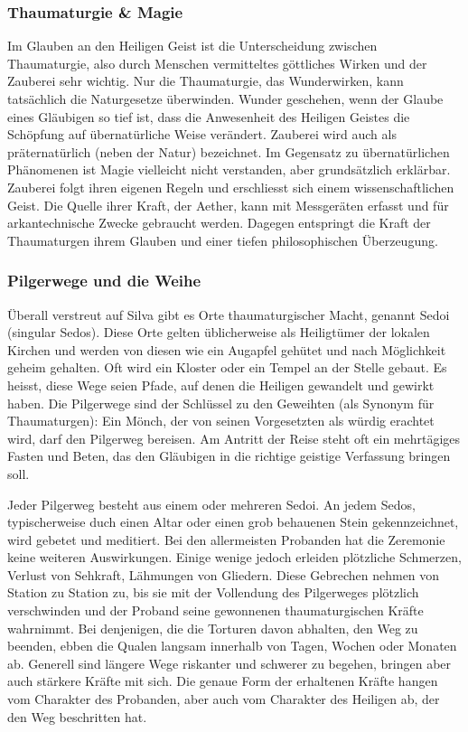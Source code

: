 \documentclass[12pt,twoside,twocolumn,openany]{book}
\begin{document}
	\subsubsection{Thaumaturgie \& Magie}
	Im Glauben an den Heiligen Geist ist die Unterscheidung zwischen Thaumaturgie, also durch Menschen vermitteltes göttliches Wirken und der Zauberei sehr wichtig. Nur die Thaumaturgie, das Wunderwirken, kann tatsächlich die Naturgesetze überwinden. Wunder geschehen, wenn der Glaube eines Gläubigen so tief ist, dass die Anwesenheit des Heiligen Geistes die Schöpfung auf übernatürliche Weise verändert. Zauberei wird auch als präternatürlich (neben der Natur) bezeichnet. Im Gegensatz zu übernatürlichen Phänomenen ist Magie vielleicht nicht verstanden, aber grundsätzlich erklärbar.
	Zauberei folgt ihren eigenen Regeln und erschliesst sich einem wissenschaftlichen Geist. Die Quelle ihrer Kraft, der Aether, kann mit Messgeräten erfasst und für arkantechnische Zwecke gebraucht werden. Dagegen entspringt die Kraft der Thaumaturgen ihrem Glauben und einer tiefen philosophischen Überzeugung.
	
	\subsubsection{Pilgerwege und die Weihe}
	Überall verstreut auf Silva gibt es Orte thaumaturgischer Macht, genannt Sedoi (singular Sedos). Diese Orte gelten üblicherweise als Heiligtümer der lokalen Kirchen und werden von diesen wie ein Augapfel gehütet und nach Möglichkeit geheim gehalten. Oft wird ein Kloster oder ein Tempel an der Stelle gebaut. Es heisst, diese Wege seien Pfade, auf denen die Heiligen gewandelt und gewirkt haben. Die Pilgerwege sind der Schlüssel zu den Geweihten (als Synonym für Thaumaturgen): Ein Mönch, der von seinen Vorgesetzten als würdig erachtet wird, darf den Pilgerweg bereisen. Am Antritt der Reise steht oft ein mehrtägiges Fasten und Beten, das den Gläubigen in die richtige geistige Verfassung bringen soll.
	
	Jeder Pilgerweg besteht aus einem oder mehreren Sedoi. An jedem Sedos, typischerweise duch einen Altar oder einen grob behauenen Stein gekennzeichnet, wird gebetet und meditiert. Bei den allermeisten Probanden hat die Zeremonie keine weiteren Auswirkungen. Einige wenige jedoch erleiden plötzliche Schmerzen, Verlust von Sehkraft, Lähmungen von Gliedern. Diese Gebrechen nehmen von Station zu Station zu, bis sie mit der Vollendung des Pilgerweges plötzlich verschwinden und der Proband seine gewonnenen thaumaturgischen Kräfte wahrnimmt. Bei denjenigen, die die Torturen davon abhalten, den Weg zu beenden, ebben die Qualen langsam innerhalb von Tagen, Wochen oder Monaten ab. Generell sind längere Wege riskanter und schwerer zu begehen, bringen aber auch stärkere Kräfte mit sich. Die genaue Form der erhaltenen Kräfte hangen vom Charakter des Probanden, aber auch vom Charakter des Heiligen ab, der den Weg beschritten hat.
	
\end{document}
